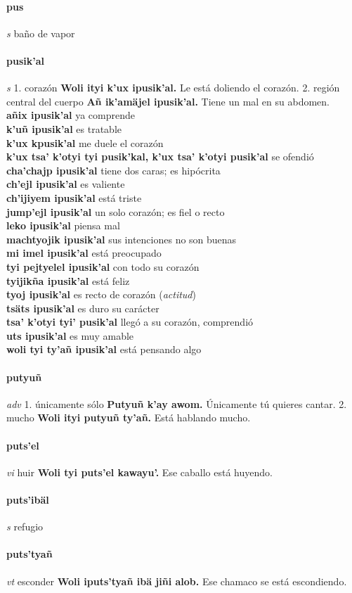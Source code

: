 \documentclass{scrbook}
\newcommand{\entry}[1]{\paragraph{#1}}
\newcommand{\onedefinition}[1]{#1.}
\newcommand{\partofspeech}[1]{\textit{#1}}
\newcommand{\spanishtranslation}[1]{#1}
\newcommand{\clarification}[1]{(\textit{#1})}
\newcommand{\cholexample}[1]{\textbf{#1}}
\newcommand{\exampletranslation}[1]{#1}
\newcommand{\secondaryentry}[1]{\\\textbf{#1}}
\newcommand{\secondtranslation}[1]{#1}
\begin{document}
\begin{multicols}{2}
\entry{pus}
\partofspeech{s}
\spanishtranslation{baño de vapor}

\entry{pusik'al}
\partofspeech{s}
\onedefinition{1}
\spanishtranslation{corazón}
\cholexample{Woli ityi k'ux ipusik'al.}
\exampletranslation{Le está doliendo el corazón.}
\onedefinition{2}
\spanishtranslation{región central del cuerpo}
\cholexample{Añ ik'amäjel ipusik'al.}
\exampletranslation{Tiene un mal en su abdomen.}
\secondaryentry{añix ipusik'al}
\secondtranslation{ya comprende}
\secondaryentry{k'uñ ipusik'al}
\secondtranslation{es tratable}
\secondaryentry{k'ux kpusik'al}
\secondtranslation{me duele el corazón}
\secondaryentry{k'ux tsa' k'otyi tyi pusik'kal, k'ux tsa' k'otyi pusik'al}
\secondtranslation{se ofendió}
\secondaryentry{cha'chajp ipusik'al}
\secondtranslation{tiene dos caras; es hipócrita}
\secondaryentry{ch'ejl ipusik'al}
\secondtranslation{es valiente}
\secondaryentry{ch'ijiyem ipusik'al}
\secondtranslation{está triste}
\secondaryentry{jump'ejl ipusik'al}
\secondtranslation{un solo corazón; es fiel o recto}
\secondaryentry{leko ipusik'al}
\secondtranslation{piensa mal}
\secondaryentry{machtyojik ipusik'al}
\secondtranslation{sus intenciones no son buenas}
\secondaryentry{mi imel ipusik'al}
\secondtranslation{está preocupado}
\secondaryentry{tyi pejtyelel ipusik'al}
\secondtranslation{con todo su corazón}
\secondaryentry{tyijikña ipusik'al}
\secondtranslation{está feliz}
\secondaryentry{tyoj ipusik'al}
\secondtranslation{es recto de corazón}
\clarification{actitud}
\secondaryentry{tsäts ipusik'al}
\secondtranslation{es duro su carácter}
\secondaryentry{tsa' k'otyi tyi' pusik'al}
\secondtranslation{llegó a su corazón, comprendió}
\secondaryentry{uts ipusik'al}
\secondtranslation{es muy amable}
\secondaryentry{woli tyi ty'añ ipusik'al}
\secondtranslation{está pensando algo}

\entry{putyuñ}
\partofspeech{adv}
\onedefinition{1}
\spanishtranslation{únicamente}
\spanishtranslation{sólo}
\cholexample{Putyuñ k'ay awom.}
\exampletranslation{Únicamente tú quieres cantar.}
\onedefinition{2}
\spanishtranslation{mucho}
\cholexample{Woli ityi putyuñ ty'añ.}
\exampletranslation{Está hablando mucho.}

\entry{puts'el}
\partofspeech{vi}
\spanishtranslation{huir}
\cholexample{Woli tyi puts'el kawayu'.}
\exampletranslation{Ese caballo está huyendo.}

\entry{puts'ibäl}
\partofspeech{s}
\spanishtranslation{refugio}

\entry{puts'tyañ}
\partofspeech{vt}
\spanishtranslation{esconder}
\cholexample{Woli iputs'tyañ ibä jiñi alob.}
\exampletranslation{Ese chamaco se está escondiendo.}


\end{multicols}
\end{document}

